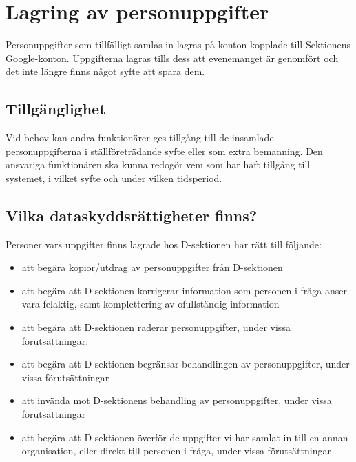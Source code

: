 \documentclass{dsekprotokoll}
\begin{document}
\section{Lagring av personuppgifter}
Personuppgifter som tillfälligt samlas in lagras på konton kopplade till Sektionens Google-konton. Uppgifterna lagras tills dess att evenemanget är genomfört och det inte längre finns något syfte att spara dem.

\subsection{Tillgänglighet}

Vid behov kan andra funktionärer ges tillgång
till de insamlade personuppgifterna i ställföreträdande syfte eller som extra bemanning. Den ansvariga funktionären ska kunna
redogör vem som har haft tillgång till systemet, i vilket syfte och under vilken tidsperiod.

\subsection{Vilka dataskyddsrättigheter finns?}
Personer vars uppgifter finns lagrade hos D-sektionen har rätt till följande:

\begin{itemize}
    \item att begära kopior/utdrag av personuppgifter från D-sektionen

    \item att begära att D-sektionen korrigerar information som personen i fråga anser vara felaktig, samt komplettering av ofullständig information

    \item att begära att D-sektionen raderar personuppgifter, under vissa förutsättningar.

    \item att begära att D-sektionen begränsar behandlingen av personuppgifter, under vissa förutsättningar

    \item att invända mot D-sektionens behandling av personuppgifter, under vissa förutsättningar

    \item att begära att D-sektionen överför de uppgifter vi har samlat in till en annan organisation, eller direkt till personen i fråga, under vissa förutsättningar

\end{itemize}
\end{document}
